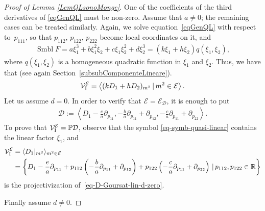 \documentclass[pdftex]{sigma}
\newcommand{\D}{\mathcal{D}}
\newcommand{\MM}{\mathcal{V}_{\textrm{\normalfont I}}}
\newcommand{\E}{\mathcal{E}}
\newcommand{\Span}[1]{\left\langle #1 \right\rangle}
\renewcommand{\P}{\mathbb{P}}
\numberwithin{equation}{section}
\begin{document}
\begin{proof}[Proof of Lemma \ref{LemQLsonoMonge}]
One of the coef\/f\/icients of the third derivatives of \eqref{eqGenQL} must be non-zero. Assume that $a\neq 0$; the remaining cases can be treated similarly. Again, we solve equation~\eqref{eqGenQL} with respect to~$p_{111}$, so that $p_{112}$, $p_{122}$, $p_{222}$ become local coordinates on it, and
\begin{gather} \label{eq-symb-quasi-linear}
\operatorname{Smbl} F=a\xi_1^3+b\xi_1^2\xi_2+c\xi_1\xi_2^2+d\xi_2^3=(k\xi_1+h\xi_2)q(\xi_1,\xi_2),
\end{gather}
where $q(\xi_1,\xi_2)$ is a homogeneous quadratic function in $\xi_1$ and $\xi_2$. Thus, we have that (see again Section~\ref{subsubComponenteLineare}).
\begin{gather} \label{eq-MME-Goursat-linear}
\MM^\E=\Span{ (kD_1+hD_2)_{m^2} \,|\, m^2\in\E}.
\end{gather}
%
Let us assume $d=0$.
In order to verify that $\E=\E_\D$, it is enough to put
\begin{gather}\label{eq-D-Goursat-lin-d-zero}
\D:= \Span{ D_1-\frac{e}{a}\partial_{p_{11}}, -\frac{b}{a}\partial_{p_{11}}+\partial_{p_{12}}, -\frac{c}{a}\partial_{p_{11}}+\partial_{p_{22}}}.
\end{gather}
To prove that $\MM^\E=\P\D$, observe that the symbol \eqref{eq-symb-quasi-linear} contains the linear factor $\xi_1$, and
\begin{align*}
\MM^\E&=\langle {D_1}|_{m^2} \rangle_{m^2\in\E } \\
&=\left\{D_1-\frac{e}{a}\partial_{p_{11}}+p_{112}\left(-\frac{b}{a}\partial_{p_{11}}+\partial_{p_{12}}\right) + p_{122}\left(-\frac{c}{a}\partial_{p_{11}}+\partial_{p_{22}}\right)\,|\, p_{112},p_{122}\in\mathbb{R}\right\}
\end{align*}
is the projectivization of~\eqref{eq-D-Goursat-lin-d-zero}.

Finally assume $d\neq 0$.


\end{proof}
\end{document}
